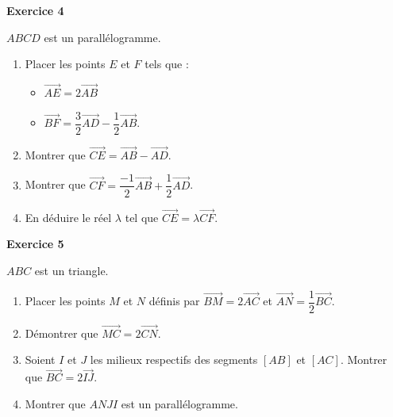 \documentclass[a4paper,11pt]{article}
\newenvironment{exercice}[1]{%
  \par\bigskip\noindent\textbf{Exercice #1}\par\smallskip\noindent\ignorespaces
}{%
  \par
}
\begin{document}
\begin{exercice}{4}
$ABCD$ est un parallélogramme.
\begin{enumerate}[label=\arabic*.]
\item Placer les points $E$ et $F$ tels que :
  \begin{itemize}[label=\textbullet]
  \item $\overrightarrow{AE}=2\overrightarrow{AB}$
  \item $\overrightarrow{BF}=\dfrac32\overrightarrow{AD}-\dfrac12\overrightarrow{AB}$.
  \end{itemize}
\item Montrer que $\overrightarrow{CE}=\overrightarrow{AB}-\overrightarrow{AD}$.
\item Montrer que $\overrightarrow{CF}=\dfrac{-1}{2}\overrightarrow{AB}+\dfrac12\overrightarrow{AD}$.
\item En déduire le réel $\lambda$ tel que $\overrightarrow{CE}=\lambda\overrightarrow{CF}$.
\end{enumerate}

\begin{center}
\end{center}
\end{exercice}

\begin{exercice}{5}
$ABC$ est un triangle.
\begin{enumerate}[label=\arabic*.]
\item Placer les points $M$ et $N$ définis par $\overrightarrow{BM}=2\overrightarrow{AC}$ et $\overrightarrow{AN}=\dfrac12\overrightarrow{BC}$.
\item Démontrer que $\overrightarrow{MC}=2\overrightarrow{CN}$.
\item Soient $I$ et $J$ les milieux respectifs des segments $[AB]$ et $[AC]$. Montrer que $\overrightarrow{BC}=2\overrightarrow{IJ}$.
\item Montrer que $ANJI$ est un parallélogramme.
\end{enumerate}

\begin{center}
\end{center}
\end{exercice}
\end{document}
